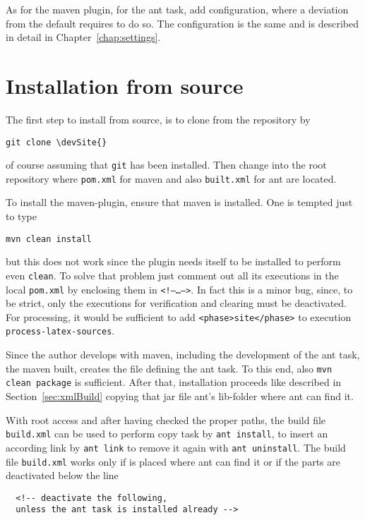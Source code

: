 As for the maven plugin, for the ant task, add configuration, 
where a deviation from the default requires to do so. 
The configuration is the same and is described in detail 
in Chapter~\ref{chap:settings}. 



\section{Installation from source}\label{sec:instSrc}

The first step to install from source, is to clone from the repository by
%
\begin{Verbatim}[commandchars=\\\{\}]
git clone \devSite{}
\end{Verbatim}
%
of course assuming that \texttt{git} has been installed.
Then change into the root repository where \texttt{pom.xml}
for maven and also \texttt{built.xml} for ant are located. 

To install the maven-plugin, ensure that maven is installed. 
One is tempted just to type 
%
\begin{Verbatim}
mvn clean install
\end{Verbatim}
%
but this does not work since the plugin needs itself to be installed
to perform even \texttt{clean}.
To solve that problem just comment out all its executions
in the local \texttt{pom.xml} by enclosing them in \texttt{<!--\ldots-->}.
In fact this is a minor bug, since, to be strict, only
the executions for verification and clearing must be deactivated.
For processing, it would be sufficient to add
\texttt{<phase>site</phase>} to execution \texttt{process-latex-sources}.
\medskip


Since the author develops with maven,
including the development of the ant task,
the maven built, creates the file \createdJar{}
defining the ant task.
To this end, also \texttt{mvn clean package} is sufficient.
After that, installation proceeds like described in Section~\ref{sec:xmlBuild}
copying that jar file ant's lib-folder where ant can find it.

With root access and after having checked the proper paths,
the build file \texttt{build.xml} can be used 
to perform copy task by \texttt{ant install},
to insert an according link by \texttt{ant link}
to remove it again with \texttt{ant uninstall}.
The build file \texttt{build.xml} works only
if \createdJar{} is placed where ant can find it
or if the parts are deactivated below the line
%
\begin{Verbatim}
  <!-- deactivate the following,
  unless the ant task is installed already -->
\end{Verbatim}

